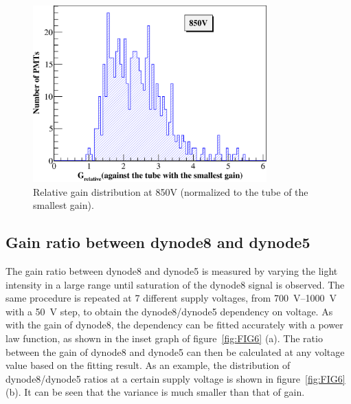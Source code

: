 \documentclass{JINST}
\begin{document}
\begin{figure}[tbp]
	\centering
	\includegraphics[width=90mm]{FIG5}
	\caption{Relative gain distribution at 850V (normalized to the tube of the smallest gain).}
	\label{fig:FIG5}
\end{figure}
	
\subsection{Gain ratio between dynode8 and dynode5}
\label{sec:psd_dy58}
	
The gain ratio between dynode8 and dynode5 is measured by varying the light intensity in a large range until saturation of the dynode8 signal is observed.
The same procedure is repeated at 7 different supply voltages, from \SIrange{700}{1000}{\volt} with a \SI{50}{\volt} step, to obtain the dynode8/dynode5 dependency on voltage.
As with the gain of dynode8, the dependency can be fitted accurately with a power law function, as shown in the inset graph of figure~\ref{fig:FIG6} (a).
The ratio between the gain of dynode8 and dynode5 can then be calculated at any voltage value based on the fitting result.
As an example, the distribution of dynode8/dynode5 ratios at a certain supply voltage is shown in figure~\ref{fig:FIG6} (b).
It can be seen that the variance is much smaller than that of gain.
	
\end{document}
